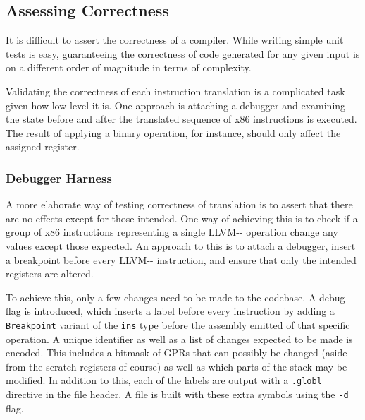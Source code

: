 \documentclass{article}
\begin{document}



%

\subsection{Assessing Correctness}
It is difficult to assert the correctness of a compiler. While writing simple unit tests is easy, guaranteeing the correctness of code generated for any given input is on a different order of magnitude in terms of complexity.

Validating the correctness of each instruction translation is a complicated task given how low-level it is. One approach is attaching a debugger and examining the state before and after the translated sequence of x86 instructions is executed. The result of applying a binary operation,  for instance, should only affect the assigned register.


\subsubsection{Debugger Harness}
A more elaborate way of testing correctness of translation is to assert that there are no effects except for those intended. One way of achieving this is to check if a group of x86 instructions representing a single LLVM-{}- operation change any values except those expected. An approach to this is to attach a debugger, insert a breakpoint before every LLVM-{}- instruction, and ensure that only the intended registers are altered.

To achieve this, only a few changes need to be made to the codebase. A debug flag is introduced, which inserts a label before every instruction by adding a \lstinline!Breakpoint! variant of the \lstinline!ins! type before the assembly emitted of that specific operation. A unique identifier as well as a list of changes expected to be made is encoded. 
This includes a bitmask of GPRs that can possibly be changed (aside from the scratch registers of course) as well as which parts of the stack may be modified. %
In addition to this, each of the labels are output with a \lstinline!.globl! directive in the file header. A file is built with these extra symbols using the \lstinline!-d! flag.
\end{document}
